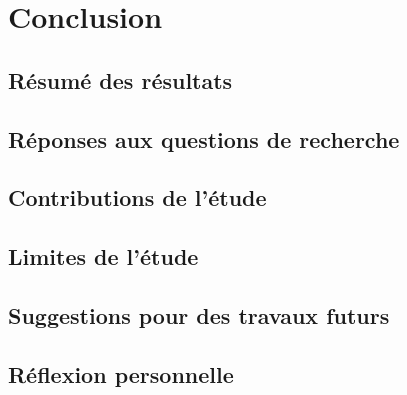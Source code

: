 \chapter{Conclusion}
\section{Résumé des résultats}
\section{Réponses aux questions de recherche}
\section{Contributions de l'étude}
\section{Limites de l'étude}
\section{Suggestions pour des travaux futurs}
\section{Réflexion personnelle}

